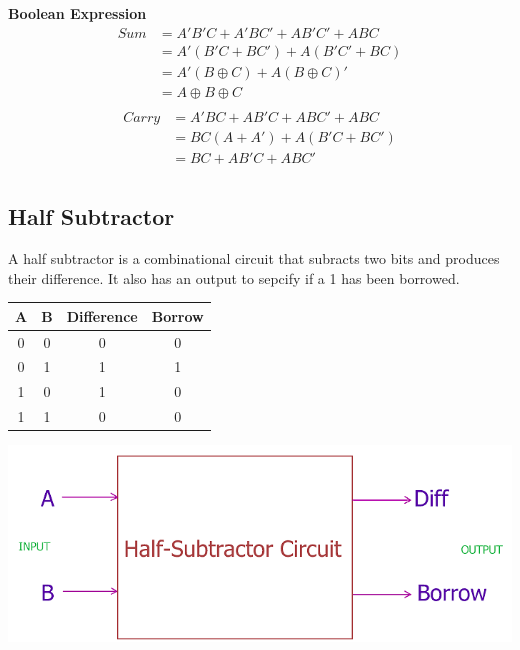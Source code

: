 \documentclass[a4paper, 12pt]{article}
\begin{document}
\textbf{Boolean Expression}
\begin{equation}
\begin{split}
	Sum & = A'B'C + A'BC' + AB'C' + ABC \\
			& = A'(B'C + BC') + A(B'C' + BC) \\
			& = A'(B \oplus C) + A (B \oplus C)' \\
			& = A \oplus B \oplus C \\
\end{split}
\end{equation}
\begin{equation}
\begin{split}
	Carry & = A'BC + AB'C + ABC' + ABC \\
				& = BC(A + A') + A(B'C + BC') \\
				& = BC + AB'C + ABC' \\
\end{split}
\end{equation}
\pagebreak

\subsection{Half Subtractor}

A half subtractor is a combinational circuit that subracts two bits and produces their difference.
It also has an output to sepcify if a 1 has been borrowed. \\

\begin{minipage}[c]{0.45\textwidth}
	\begin{center}
	\begin{tabular}[h]{|c|c|c|c|}
	\hline
	A & B & Difference & Borrow \\
	\hline
	0 & 0 & 0 & 0 \\
	0 & 1 & 1 & 1 \\
	1 & 0 & 1 & 0 \\
	1 & 1 & 0 & 0 \\
	\hline
	\end{tabular}
	\end{center}
\end{minipage}
\begin{minipage}[c]{0.5\textwidth}
	\centering
	\includegraphics[scale=0.25]{half-sub-block.png}
\end{minipage}
\end{document}
